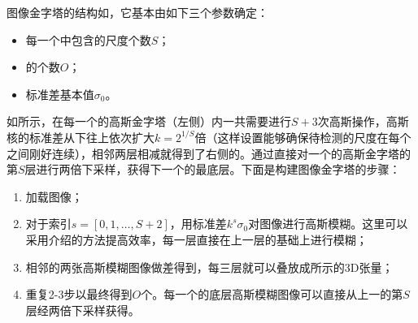 \DoG 图像金字塔的结构如，它基本由如下三个参数确定：
\begin{itemize}
	\item 每一个\octave 中包含的尺度个数$S$；
	\item \octave 的个数$O$；
	\item 标准差基本值$\sigma_0$。
\end{itemize}

如所示，在每一个\octave 的高斯金字塔（左侧）内一共需要进行$S+3$次高斯操作，高斯核的标准差从下往上依次扩大$k=2^{1/S}$倍（这样设置能够确保待检测的尺度在每个\octave 之间刚好连续），相邻两层相减就得到了右侧的\DoG 。通过直接对一个\octave 的高斯金字塔的第$S$层进行两倍下采样，获得下一个\octave 的最底层。下面是构建\DoG 图像金字塔的步骤：
\begin{enumerate}
	\item 加载图像；
	\item 对于索引$s=[0, 1, \ldots, S+2]$，用标准差$k^s\sigma_0$对图像进行高斯模糊。这里可以采用介绍的方法提高效率，每一层直接在上一层的基础上进行模糊；
	\item 相邻的两张高斯模糊图像做差得到\DoG，每三层\DoG 就可以叠放成所示的3D张量；
	\item 重复2-3步以最终得到$O$个\octave 。每一个\octave 的底层高斯模糊图像可以直接从上一\octave 的第$S$层经两倍下采样获得。
\end{enumerate}
